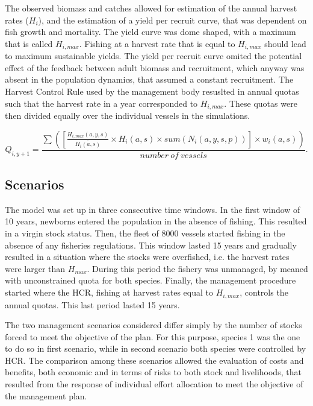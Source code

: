 \documentclass[12pt,oneline,a4paper,numbib]{ouparticle}
\numberwithin{equation}{subsection} %
\begin{document}
The observed biomass and catches allowed for estimation of the annual harvest rates ($H_i$), and the estimation of a yield per recruit curve, that was dependent on fish growth and mortality. The yield curve was dome shaped, with a maximum that is called $H_{i,max}$. Fishing at a harvest rate that is equal to $H_{i,max}$  should lead to maximum sustainable yields. The yield per recruit curve omited the potential effect of the feedback between adult biomass and recruitment, which anyway was absent in the population dynamics, that assumed a constant recruitment. The Harvest Control Rule used by the management body resuslted in annual quotas such that the harvest rate in a year corresponded to $H_{i,max}$. These quotas were then divided equally over the individual vessels in the simulations.  

\begin{equation}
 Q_{i,y+1} = \frac
                {\sum( [\frac{H_{i,max}(a,y,s)}{\bar{H_i(a,s)}} \times H_i(a,s) \times sum( N_i (a, y, s, p))] \times w_i(a,s)) }
                {number\  of\  vessels}.
\end{equation}


\subsection{Scenarios}

The model was set up in three consecutive time windows. In the first window of 10 years, newborns entered the population in the absence of fishing. This resulted in a virgin stock status. Then, the fleet of 8000 vessels started fishing in the absence of any fisheries regulations. This window lasted 15 years and gradually resulted in a situation where the stocks were overfished, i.e. the harvest rates were larger than $H_{max}$. During this period the fishery was unmanaged, by meaned with unconstrained quota for both species. Finally, the management procedure started where the HCR, fishing at harvest rates equal to $H_{i,max}$, controls the annual quotas. This last period lasted 15 years. 
      
The two management scenarios considered differ simply by the number of stocks forced to meet the objective of the plan. For this purpose, species 1 was the one to do so in first scenario, while in second scenario both species were controlled by HCR. The comparison among these scenarios allowed the evaluation of costs and benefits, both economic and in terms of risks to both stock and livelihoods, that resulted from the response of individual effort allocation to meet the objective of the management plan.
 
\end{document}
